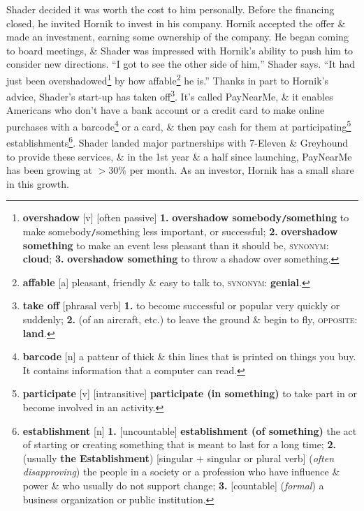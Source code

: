 \documentclass[oneside]{book}
\numberwithin{equation}{section}
\begin{document}
Shader decided it was worth the cost to him personally. Before the financing closed, he invited Hornik to invest in his company. Hornik accepted the offer \& made an investment, earning some ownership of the company. He began coming to board meetings, \& Shader was impressed with Hornik's ability to push him to consider new directions. ``I got to see the other side of him,'' Shader says. ``It had just been overshadowed\footnote{\textbf{overshadow} [v] [often passive] \textbf{1.} \textbf{overshadow somebody\texttt{/}something} to make somebody\texttt{/}something less important, or successful; \textbf{2.} \textbf{overshadow something} to make an event less pleasant than it should be, \textsc{synonym}: \textbf{cloud}; \textbf{3.} \textbf{overshadow something} to throw a shadow over something.} by how affable\footnote{\textbf{affable} [a] pleasant, friendly \& easy to talk to, \textsc{synonym}: \textbf{genial}.} he is.'' Thanks in part to Hornik's advice, Shader's start-up has taken off\footnote{\textbf{take off} [phrasal verb] \textbf{1.} to become successful or popular very quickly or suddenly; \textbf{2.} (of an aircraft, etc.) to leave the ground \& begin to fly, \textsc{opposite}: \textbf{land}.}. It's called PayNearMe, \& it enables Americans who don't have a bank account or a credit card to make online purchases with a barcode\footnote{\textbf{barcode} [n] a pattenr of thick \& thin lines that is printed on things you buy. It contains information that a computer can read.} or a card, \& then pay cash for them at participating\footnote{\textbf{participate} [v] [intransitive] \textbf{participate (in something)} to take part in or become involved in an activity.} establishments\footnote{\textbf{establishment} [n] \textbf{1.} [uncountable] \textbf{establishment (of something)} the act of starting or creating something that is meant to last for a long time; \textbf{2.} (usually \textbf{the Establishment}) [singular $+$ singular or plural verb] (\textit{often disapproving}) the people in a society or a profession who have influence \& power \& who usually do not support change; \textbf{3.} [countable] (\textit{formal}) a business organization or public institution.}. Shader landed major partnerships with 7-Eleven \& Greyhound to provide these services, \& in the 1st year \& a half since launching, PayNearMe has been growing at $> 30$\% per month. As an investor, Hornik has a small share in this growth.
\end{document}
